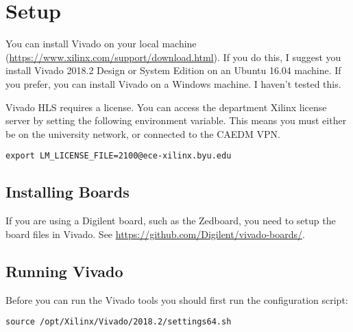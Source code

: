 



\newlength\myheight
\newlength\mydepth
\settototalheight{}
\settodepth{}
\setlength\fboxsep{0pt}
\newcommand*\inlinegraphics[1]{%
  \settototalheight\myheight{Xygp}%
  \settodepth\mydepth{Xygp}%
  \raisebox{-\mydepth}{\texttt{[image: \#1]}}%
}

\setuppage

\makeatletter
{}
\makeatother



\maketitle
\thispagestyle{fancy}

\section{Setup}
You can install Vivado on your local machine (\url{https://www.xilinx.com/support/download.html}).  If you do this, I suggest you install Vivado 2018.2 Design or System Edition on an Ubuntu 16.04 machine.  If you prefer, you can install Vivado on a Windows machine.  I haven't tested this.  

Vivado HLS requires a license.  You can access the department Xilinx license server by setting the following environment variable.  This means you must either be on the university network, or connected to the CAEDM VPN.

\begin{lstlisting}
export LM_LICENSE_FILE=2100@ece-xilinx.byu.edu
\end{lstlisting}

\subsection{Installing Boards}
If you are using a Digilent board, such as the Zedboard, you need to setup the board files in Vivado.  See \url{https://github.com/Digilent/vivado-boards/}.

\subsection{Running Vivado}
Before you can run the Vivado tools you should first run the configuration script:
\begin{lstlisting}
source /opt/Xilinx/Vivado/2018.2/settings64.sh
\end{lstlisting}

